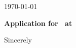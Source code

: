 \documentclass[a4paper, 12pt]{article}
\begin{document}
\begin{minipage}[t]{0.28\textwidth}
  
\end{minipage}
\hfill
\begin{minipage}[t]{0.65\textwidth}
\vspace{0pt}

\hfill \today

\vspace{0.8cm}

\textbf{Application for \JobTitle\ at \Company}

\vspace{0.4cm}

\Salutation

\vspace{0.4cm}

\JobContent

\vspace{0.8cm}

Sincerely \\[1cm]
\Name

\end{minipage}
\end{document}

